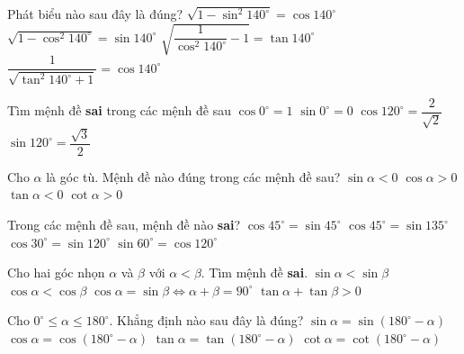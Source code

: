 \begin{ex}
	Phát biểu nào sau đây là đúng?
	\choice
	{$\sqrt{1-\sin^2 140^\circ}=\cos 140^\circ$}
	{\True $\sqrt{1-\cos^2 140^\circ}=\sin 140^\circ$}
	{$\sqrt{\dfrac{1}{\cos^2 140^\circ}-1}=\tan 140^\circ$}
	{$\dfrac{1}{\sqrt{\tan^2 140^\circ+1}}=\cos 140^\circ$}
\end{ex}
\begin{ex}
	Tìm mệnh đề \textbf{sai} trong các mệnh đề sau
	\choice
	{$\cos 0^\circ=1$}
	{$\sin 0^\circ=0$}
	{\True $\cos 120^\circ=\dfrac{2}{\sqrt{2}}$}
	{$\sin 120^\circ=\dfrac{\sqrt{3}}{2}$}
\end{ex}
\begin{ex}
	Cho $\alpha$ là góc tù. Mệnh đề nào đúng trong các mệnh đề sau?
	\choice
	{$\sin\alpha<0$}
	{$\cos\alpha>0$}
	{\True $\tan\alpha<0$}
	{$\cot\alpha>0$}
\end{ex}
\begin{ex}
	Trong các mệnh đề sau, mệnh đề nào \textbf{sai}?
	\choice
	{$\cos 45^\circ=\sin 45^\circ$}
	{$\cos 45^\circ=\sin 135^\circ$}
	{$\cos 30^\circ=\sin 120^\circ$}
	{\True $\sin 60^\circ=\cos 120^\circ$}
\end{ex}
\begin{ex}
	Cho hai góc nhọn $\alpha$ và $\beta$ với $\alpha<\beta$. Tìm mệnh đề \textbf{sai}.
	\choice
	{$\sin\alpha<\sin\beta$}
	{\True $\cos\alpha<\cos\beta$}
	{$\cos\alpha=\sin\beta\Leftrightarrow \alpha+\beta=90^\circ$}
	{$\tan\alpha+\tan\beta>0$}
\end{ex}
\begin{ex}
	Cho $0^{\circ}\leq\alpha\leq 180^{\circ}$. Khẳng định nào sau đây là đúng?
	\choice
	{\True $\sin\alpha=\sin(180^{\circ}-\alpha)$}
	{$\cos\alpha=\cos(180^{\circ}-\alpha)$}
	{$\tan\alpha=\tan(180^{\circ}-\alpha)$}
	{$\cot\alpha=\cot(180^{\circ}-\alpha)$}
\end{ex}
